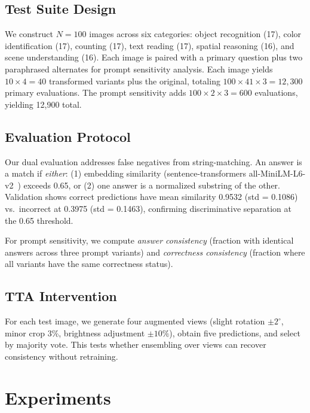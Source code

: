 \documentclass{cvpr}
\begin{document}
\subsection{Test Suite Design}
\label{sec:test_suite}

We construct $N = 100$ images across six categories: object recognition (17), color identification (17), counting (17), text reading (17), spatial reasoning (16), and scene understanding (16). Each image is paired with a primary question plus two paraphrased alternates for prompt sensitivity analysis. Each image yields $10 \times 4 = 40$ transformed variants plus the original, totaling $100 \times 41 \times 3 = 12{,}300$ primary evaluations. The prompt sensitivity adds $100 \times 2 \times 3 = 600$ evaluations, yielding 12{,}900 total.

\subsection{Evaluation Protocol}
\label{sec:eval_protocol}

Our dual evaluation addresses false negatives from string-matching. An answer is a match if \textit{either}: (1) embedding similarity (sentence-transformers all-MiniLM-L6-v2~\cite{reimers2019sentence}) exceeds 0.65, or (2) one answer is a normalized substring of the other. Validation shows correct predictions have mean similarity 0.9532 (std = 0.1086) vs.\ incorrect at 0.3975 (std = 0.1463), confirming discriminative separation at the 0.65 threshold.

For prompt sensitivity, we compute \textit{answer consistency} (fraction with identical answers across three prompt variants) and \textit{correctness consistency} (fraction where all variants have the same correctness status).

\subsection{TTA Intervention}
\label{sec:tta_method}

For each test image, we generate four augmented views (slight rotation $\pm 2^\circ$, minor crop 3\%, brightness adjustment $\pm 10\%$), obtain five predictions, and select by majority vote. This tests whether ensembling over views can recover consistency without retraining.

\section{Experiments}
\label{sec:experiments}
\end{document}
